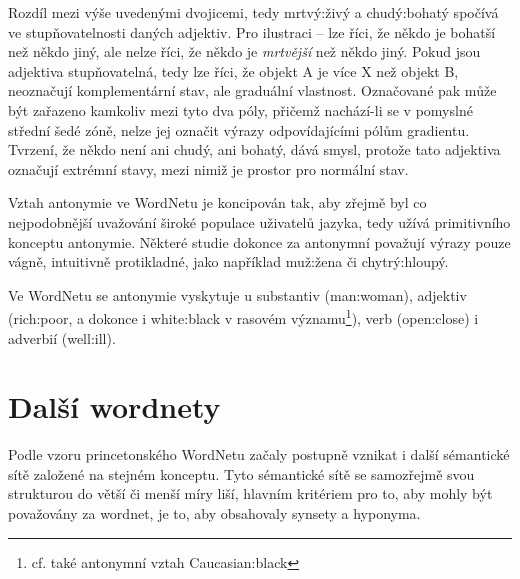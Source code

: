 \documentclass[a4paper, 11pt, oneside, showtrims]{book}
\newcommand\ex{\textsf}
\begin{document}
					Rozdíl mezi výše uvedenými dvojicemi, tedy \ex{mrtvý:živý} a \ex{chudý:bohatý} spočívá ve stupňovatelnosti daných adjektiv. Pro ilustraci -- lze říci, že někdo je \ex{bohatší} než někdo jiný, ale nelze říci, že někdo je \ex{\textit{mrtvější}} než někdo jiný. Pokud jsou adjektiva stupňovatelná, tedy lze říci, že objekt A je více X než objekt B, neoznačují komplementární stav, ale graduální vlastnost. Označované pak může být zařazeno kamkoliv mezi tyto dva póly, přičemž nachází-li se v pomyslné střední šedé zóně, nelze jej označit výrazy odpovídajícími pólům gradientu. Tvrzení, že někdo \ex{není ani chudý, ani bohatý}, dává smysl, protože tato adjektiva označují extrémní stavy, mezi nimiž je prostor pro normální stav. \parencite{paradis2006antonymy} 

					Vztah antonymie ve WordNetu je koncipován tak, aby zřejmě byl co nejpodobnější uvažování široké populace uživatelů jazyka, tedy užívá primitivního konceptu antonymie. Některé studie dokonce za antonymní považují výrazy pouze vágně, intuitivně protikladné, jako například \ex{muž:žena} či \ex{chytrý:hloupý}. \parencite{lehrer1982antonymy}



					Ve WordNetu se antonymie vyskytuje u substantiv (\ex{man:woman}), adjektiv (\ex{rich:poor}, a dokonce i \ex{white:black} v rasovém významu\footnote{cf. také antonymní vztah \ex{Caucasian:black}}), verb (\ex{open:close}) i adverbií (\ex{well:ill}). \parencite{princetonWN}



		\chapter{Další wordnety}
		\label{cha:dalsi_wordnety}

		
			Podle vzoru princetonského WordNetu začaly postupně vznikat i další sémantické sítě založené na stejném konceptu. Tyto sémantické sítě se samozřejmě svou strukturou do větší či menší míry liší, hlavním kritériem pro to, aby mohly být považovány za wordnet, je to, aby obsahovaly synsety a hyponyma. \parencite{gwa2013wordnetsworld} %
\end{document}
